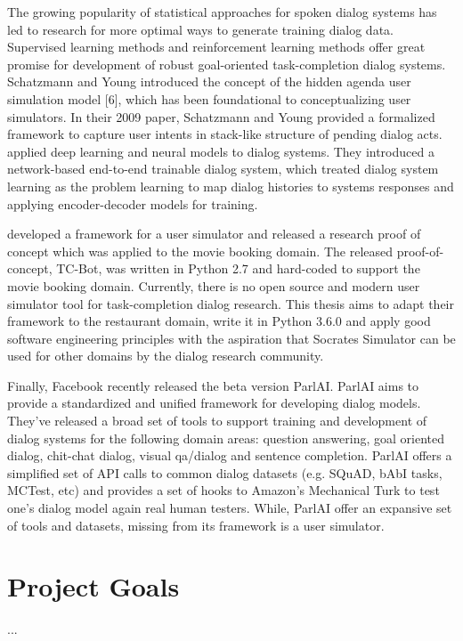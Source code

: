 The growing popularity of statistical approaches for spoken dialog systems has led to research for more optimal ways to generate training dialog data. Supervised learning methods and reinforcement learning methods offer great promise for development of robust goal-oriented task-completion dialog systems. Schatzmann and Young introduced the concept of the hidden agenda user simulation model [6], which has been foundational to conceptualizing user simulators. In their 2009 paper, Schatzmann and Young provided a formalized framework to capture user intents in stack-like structure of pending dialog acts. \cite{BordesW16} applied deep learning and neural models to dialog systems. They introduced a network-based end-to-end trainable dialog system, which treated dialog system learning as the problem learning to map dialog histories to systems responses and applying encoder-decoder models for training. 

\cite{li_usersim} developed a framework for a user simulator and released a research proof of concept which was applied to the movie booking domain. The released proof-of-concept, TC-Bot, was written in Python 2.7 and hard-coded to support the movie booking domain. Currently, there is no open source and modern user simulator tool for task-completion dialog research.  This thesis aims to adapt their framework to the restaurant domain, write it in Python 3.6.0 and apply good software engineering principles with the aspiration that Socrates Simulator can be used for other domains by the dialog research community. 

Finally, Facebook recently released the beta version ParlAI. ParlAI aims to provide a standardized and unified framework for developing dialog models. They’ve released a broad set of tools to support training and development of dialog systems for the following domain areas: question answering, goal oriented dialog, chit-chat dialog, visual qa/dialog and sentence completion. ParlAI offers a simplified set of API calls to common dialog datasets (e.g. SQuAD, bAbI tasks, MCTest, etc) and provides a set of hooks to Amazon’s Mechanical Turk to test one’s dialog model again real human testers. While, ParlAI offer an expansive set of tools and datasets, missing from its framework is a user simulator. 

\section{Project Goals}
\label{sec:goals}


...

